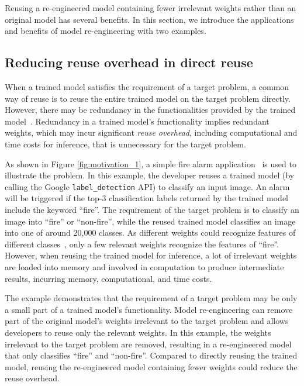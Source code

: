 
Reusing a re-engineered model containing fewer irrelevant weights rather than an original model has several benefits. In this section, we introduce the applications and benefits of model re-engineering with two examples.

\subsection{Reducing reuse overhead in direct reuse}
\label{subsec:motivation_1}

When a trained model satisfies the requirement of a target problem, a common way of reuse is to reuse the entire trained model on the target problem directly.
However, there may be redundancy in the functionalities provided by the trained model~\cite{nnmodularity2022icse,mltest}.
Redundancy in a trained model's functionality implies redundant weights, which may incur significant \textit{reuse overhead}, including computational and time costs for inference, that is unnecessary for the target problem.

As shown in Figure \ref{fig:motivation_1}, a simple fire alarm application~\cite{fireapp} is used to illustrate the problem.
In this example, the developer reuses a trained model (by calling the Google \texttt{label\_detection} API) to classify an input image.
An alarm will be triggered if the top-3 classification labels returned by the trained model include the keyword ``fire''.
The requirement of the target problem is to classify an image into ``fire'' or ``non-fire'', while the reused trained model classifies an image into one of around 20,000 classes.
As different weights could recognize features of different classes~\cite{yamashita2018convolutional,bau2020understanding}, only a few relevant weights recognize the features of ``fire''.
However, when reusing the trained model for inference, a lot of irrelevant weights are loaded into memory and involved in computation to produce intermediate results, incurring memory, computational, and time costs.

The example demonstrates that the requirement of a target problem may be only a small part of a trained model's functionality.
Model re-engineering can remove part of the original model's weights irrelevant to the target problem and allows developers to reuse only the relevant weights.
In this example, 
the weights irrelevant to the target problem are removed, resulting in a re-engineered model that only classifies ``fire'' and ``non-fire''.
Compared to directly reusing the trained model, reusing the re-engineered model containing fewer weights could reduce the reuse overhead.

